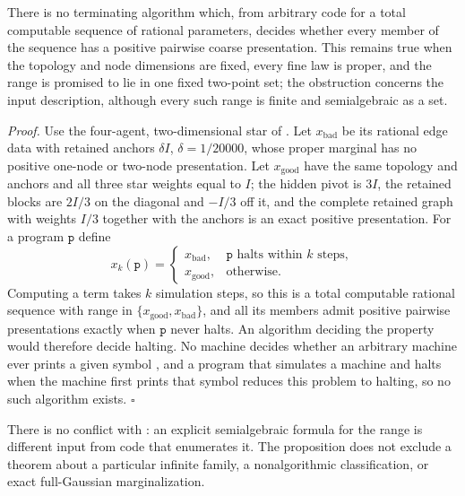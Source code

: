 There is no terminating algorithm which, from arbitrary code for a total
computable sequence of rational parameters, decides whether every member of the
sequence has a positive pairwise coarse presentation. This remains true when the
topology and node dimensions are fixed, every fine law is proper, and the range
is promised to lie in one fixed two-point set; the obstruction concerns the
input description, although every such range is finite and semialgebraic as a
set. 

\noindent\emph{Proof.}
Use the four-agent, two-dimensional star of
. Let \(x_{\mathrm{bad}}\) be its
rational edge data with retained anchors \(\delta I\), \(\delta=1/20000\), whose
proper marginal has no positive one-node or two-node presentation. Let
\(x_{\mathrm{good}}\) have the same topology and anchors and all three star
weights equal to \(I\); the hidden pivot is \(3I\), the retained blocks are
\(2I/3\) on the diagonal and \(-I/3\) off it, and the complete retained graph with
weights \(I/3\) together with the anchors is an exact positive presentation. For
a program \(\mathtt p\) define
\begin{equation}
x_k(\mathtt p)=
\begin{cases}
x_{\mathrm{bad}},&\mathtt p\text{ halts within }k\text{ steps},\\
x_{\mathrm{good}},&\text{otherwise}.
\end{cases}
\label{eq:cg-kron-enumerator-reduction}
\end{equation}
Computing a term takes \(k\) simulation steps, so this is a total computable
rational sequence with range in \(\{x_{\mathrm{good}},x_{\mathrm{bad}}\}\), and all
its members admit positive pairwise presentations exactly when \(\mathtt p\) never
halts. An algorithm deciding the property would therefore decide halting. No
machine decides whether an arbitrary machine ever prints a given symbol
\citep[Sec.~8]{Turing1937}, and a program that simulates a machine and halts when
the machine first prints that symbol reduces this problem to halting, so no such
algorithm exists. \(\square\)

There is no conflict with : an
explicit semialgebraic formula for the range is different input from code that
enumerates it. The proposition does not exclude a theorem about a particular
infinite family, a nonalgorithmic classification, or exact full-Gaussian
marginalization.

